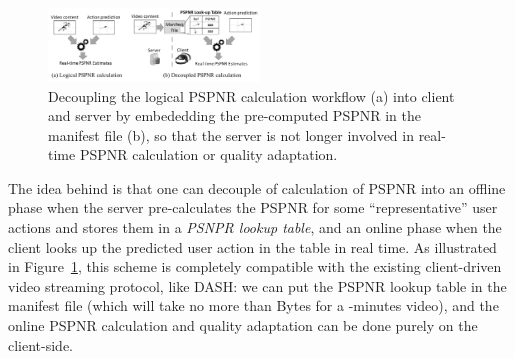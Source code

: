 \begin{figure}
  \centering
  \includegraphics[width=0.5\textwidth]{figures/decoupling.pdf}
  \caption{Decoupling the logical PSPNR calculation workflow (a) into client and server by embededding the pre-computed PSPNR in the manifest file (b), so that the server is not longer involved in real-time PSPNR calculation or quality adaptation.}
  \label{fig:decoupling}
  \end{figure}


The idea behind \name is that one can decouple of calculation of PSPNR into an offline phase when the server pre-calculates the PSPNR for some ``representative'' user actions and stores them in a {\em PSNPR lookup table}, and an online phase when the client looks up the predicted user action in the table in real time. 
As illustrated in Figure~\ref{fig:decoupling}, this scheme is completely compatible with the existing client-driven video streaming protocol, like DASH: we can put the PSPNR lookup table in the manifest file (which will take no more than \fillme Bytes for a \fillme-minutes video), and the online PSPNR calculation and quality adaptation can be done purely on the client-side.